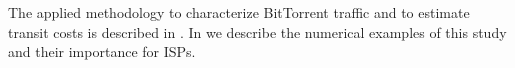 
The applied methodology to characterize BitTorrent traffic and to estimate transit costs is described in . In  we describe the numerical examples of this study and their importance for ISPs.



